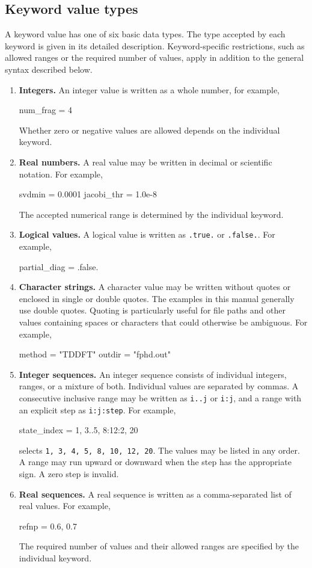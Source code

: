 \subsection{Keyword value types}
\label{sec-keyword-value-types}

A keyword value has one of six basic data types. The type accepted by each keyword is given in its detailed description. Keyword-specific restrictions, such as allowed ranges or the required number of values, apply in addition to the general syntax described below.

\begin{enumerate}

\item \textbf{Integers.}
An integer value is written as a whole number, for example,
\begin{lst-script}
num_frag = 4
\end{lst-script}
Whether zero or negative values are allowed depends on the individual keyword.

\item \textbf{Real numbers.}
A real value may be written in decimal or scientific notation. For example,
\begin{lst-script}
svdmin = 0.0001
jacobi_thr = 1.0e-8
\end{lst-script}
The accepted numerical range is determined by the individual keyword.

\item \textbf{Logical values.}
A logical value is written as \texttt{.true.} or \texttt{.false.}. For example,
\begin{lst-script}
partial_diag = .false.
\end{lst-script}

\item \textbf{Character strings.}
A character value may be written without quotes or enclosed in single or double quotes. The examples in this manual generally use double quotes. Quoting is particularly useful for file paths and other values containing spaces or characters that could otherwise be ambiguous. For example,
\begin{lst-script}
method = "TDDFT"
outdir = "fphd.out"
\end{lst-script}

\item \textbf{Integer sequences.}
An integer sequence consists of individual integers, ranges, or a mixture of both. Individual values are separated by commas. A consecutive inclusive range may be written as \texttt{i..j} or \texttt{i:j}, and a range with an explicit step as \texttt{i:j:step}. For example,
\begin{lst-script}
state_index = 1, 3..5, 8:12:2, 20
\end{lst-script}
selects \texttt{1, 3, 4, 5, 8, 10, 12, 20}. The values may be listed in any order. A range may run upward or downward when the step has the appropriate sign. A zero step is invalid.

\item \textbf{Real sequences.}
A real sequence is written as a comma-separated list of real values. For example,
\begin{lst-script}
refnp = 0.6, 0.7
\end{lst-script}
The required number of values and their allowed ranges are specified by the individual keyword.

\end{enumerate}
